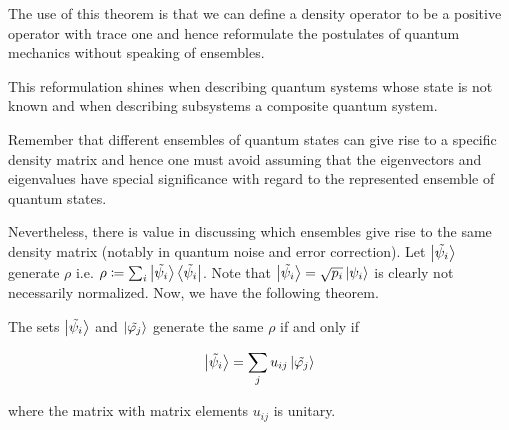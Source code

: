 \documentclass[main.tex]{subfiles}
\begin{document}
The use of this theorem is that we can define a density operator to be a positive operator with trace one and hence reformulate the postulates of quantum mechanics without speaking of ensembles.

This reformulation shines when describing quantum systems whose state is not known and when describing subsystems a composite quantum system.

%
%
%

Remember that different ensembles of quantum states can give rise to a specific density matrix and hence one must avoid assuming that the eigenvectors and eigenvalues have special significance with regard to the represented ensemble of quantum states.

Nevertheless, there is value in discussing which ensembles give rise to the same density matrix (notably in quantum noise and error correction). Let $\ket{\tilde{\psi_i}}$ generate $\rho$ i.e. $\rho\coloneqq\sum_i\ket{\tilde{\psi_i}}\bra{\tilde{\psi_i}}$. Note that $\ket{\tilde{\psi_i}} = \sqrt{p_i}\ket{\psi_i}$ is clearly not necessarily normalized. Now, we have the following theorem.

\begin{theorem}
The sets $\ket{\tilde{\psi_i}}$ and $\ket{\tilde{\varphi_j}}$ generate the same $\rho$ if and only if

\begin{align*}
	\ket{\tilde{\psi_i}} = \sum_j u_{ij}\ket{\tilde{\varphi_j}}
\end{align*}

where the matrix with matrix elements $u_{ij}$ is unitary.
\end{theorem}
\end{document}

